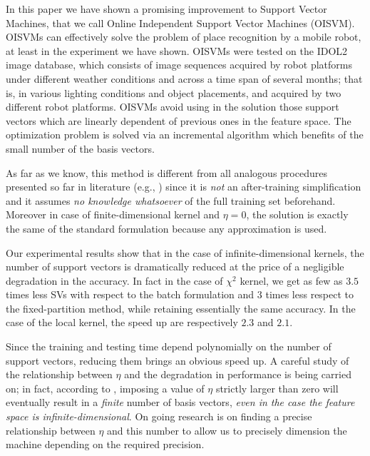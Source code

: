 In this paper we have shown a promising improvement to Support Vector
Machines, that we call Online Independent Support Vector Machines
(OISVM). OISVMs can effectively solve the problem of place recognition
by a mobile robot, at least in the experiment we have shown. OISVMs
were tested on the IDOL2 image database, which consists of image
sequences acquired by robot platforms under different weather
conditions and across a time span of several months; that is, in
various lighting conditions and object placements, and acquired by two
different robot platforms. OISVMs avoid using in the solution those
support vectors which are linearly dependent of previous ones in the
feature space. The optimization problem is solved via an incremental
algorithm which benefits of the small number of the basis vectors.

As far as we know, this method is different from all
analogous procedures presented so far in literature (e.g.,
\cite{DownsGM01,nguyen2005,LeeM01,schoel06,KeerthiCDC06}) since it
is \emph{not} an after-training simplification and it assumes
\emph{no knowledge whatsoever} of the full training set beforehand.
Moreover in case of finite-dimensional kernel and $\eta=0$, the
solution is exactly the same of the standard formulation because
any approximation is used.

Our experimental results show that in
the case of infinite-dimensional kernels, the number of support vectors
is dramatically reduced at the price of a negligible degradation in
the accuracy. In fact in the case of $\chi^2$ kernel, we get as few
as $3.5$ times less SVs with respect to the batch formulation and $3$
times less respect to the fixed-partition method, while retaining
essentially the same accuracy. In the case of the local kernel,
the speed up are respectively $2.3$ and $2.1$.

Since the training and testing time depend polynomially on the
number of support vectors, reducing them brings an obvious speed up. A
careful study of the relationship between $\eta$ and the degradation
in performance is being carried on; in fact, according to
\cite{engel2004}, imposing a value of $\eta$ strictly larger than zero
will eventually result in a \emph{finite} number of basis vectors,
\emph{even in the case the feature space is
infinite-dimensional}. On going research is on finding a precise
relationship between $\eta$ and this number to allow
us to precisely dimension the machine depending on the required
precision.

